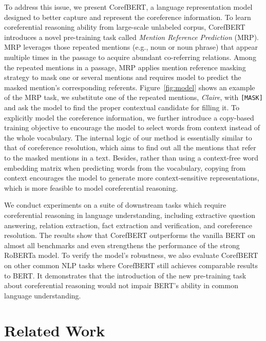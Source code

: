 \documentclass[11pt,a4paper]{article}
\newcommand\CorefBERT{CorefBERT\xspace}
\begin{document}
To address this issue, we present \CorefBERT, a language representation model designed to better capture and represent the coreference information. To learn coreferential reasoning ability from large-scale unlabeled corpus, \CorefBERT introduces a novel pre-training task called \emph{Mention Reference Prediction} (MRP). MRP leverages those repeated mentions (e.g., noun or noun phrase) that appear multiple times in the passage to acquire abundant co-referring relations. Among the repeated mentions in a passage, MRP applies mention reference masking strategy to mask one or several mentions  and requires model to predict the masked mention's corresponding referents. 
Figure~\ref{fig:model} shows an example of the MRP task, we substitute one of the repeated mentions, \emph{Claire}, with \texttt{[MASK]} and ask the model to find the proper contextual candidate for filling it. 
To explicitly model the coreference information, we further introduce a copy-based training objective to encourage the model to select words from context instead of the whole vocabulary. The internal logic of our method is essentially similar to that of coreference resolution, which aims to find out all the mentions that refer to the masked mentions in a text. Besides, rather than using a context-free word embedding matrix when predicting words from the vocabulary, copying from context encourages the model to generate more context-sensitive representations, which is more feasible to model coreferential reasoning.

We conduct experiments on a suite of downstream tasks which require coreferential reasoning in language understanding, including extractive question answering, relation extraction, fact extraction and verification, and coreference resolution. The results show that \CorefBERT outperforms the vanilla BERT on almost all benchmarks and even strengthens the performance of the strong RoBERTa model. To verify the model's robustness, we also evaluate CorefBERT on other common NLP tasks where CorefBERT still achieves comparable results to BERT. It demonstrates that the introduction of the new pre-training task about coreferential reasoning would not impair BERT's ability in common language understanding.









\section{Related Work}
\end{document}
